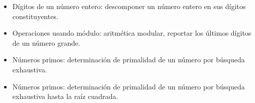 \begin{itemize}
\item[\basic] Dígitos de un número entero: descomponer un número entero en sus
  dígitos constituyentes.
\item[\basic] Operaciones usando módulo: aritmética modular, reportar los
  últimos dígitos de un número grande.
\item[\basic] Números primos: determinación de primalidad de un número por
  búsqueda exhaustiva.
\item[\advanced] Números primos: determinación de primalidad de un número por
  búsqueda exhaustiva hasta la raíz cuadrada.
\end{itemize}

